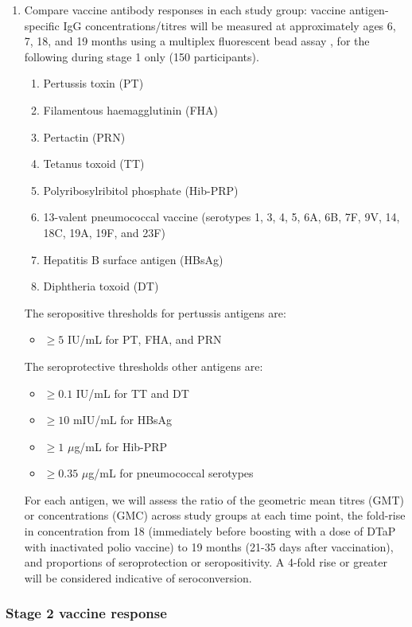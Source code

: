 \documentclass{bmcart}
\begin{document}
\begin{enumerate}[resume]
	\item Compare vaccine antibody responses in each study group:
	vaccine antigen-specific IgG concentrations/titres will be measured at approximately ages 6, 7, 18, and 19 months using a multiplex fluorescent bead assay \cite{van2008development}, for the following during stage 1 only (150 participants).
	\begin{enumerate}
		\item Pertussis toxin (PT)
		\item Filamentous haemagglutinin (FHA)
		\item Pertactin (PRN)
		\item Tetanus toxoid (TT)
		\item Polyribosylribitol phosphate (Hib-PRP)
		\item 13-valent pneumococcal vaccine (serotypes 1, 3, 4, 5, 6A, 6B, 7F, 9V, 14, 18C, 19A, 19F, and 23F)
		\item Hepatitis B surface antigen (HBsAg)
		\item Diphtheria toxoid (DT)
	\end{enumerate}
	The seropositive thresholds\label{lab:sero-thresholds} for pertussis antigens are:
	\begin{itemize}
	    \item $\geq 5$ IU/mL for PT, FHA, and PRN
	\end{itemize}
	The seroprotective thresholds other antigens are:
	\begin{itemize}
		\item $\geq 0.1$ IU/mL  for TT \cite{whotetanus} and DT
		\item $\geq 10$ mIU/mL for HBsAg
		\item $\geq 1$ $\mu$g/mL for Hib-PRP \cite{kayhty1983protective}
		\item $\geq 0.35$ $\mu$g/mL for pneumococcal serotypes \cite{siber2007estimating,whopneumo}
	\end{itemize}
	For each antigen, we will assess the ratio of the geometric mean titres (GMT) or concentrations (GMC) across study groups at each time point, the fold-rise in concentration from 18 (immediately before boosting with a dose of DTaP with inactivated polio vaccine) to 19 months (21-35 days after vaccination), and proportions of seroprotection or seropositivity.
	A 4-fold rise or greater will be considered indicative of seroconversion.
\end{enumerate}

\subsubsection*{Stage 2 vaccine response}
\end{document}
